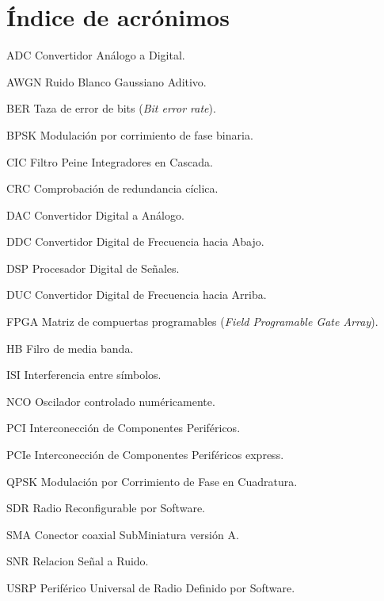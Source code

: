 \chapter*{\'Indice de acr\'onimos}
%

\begin{symbollist*}

\item[ADC]  Convertidor An\'alogo a Digital.
\item[AWGN] Ruido Blanco Gaussiano Aditivo.
\item[BER]  Taza de error de bits (\emph{Bit error rate}).
\item[BPSK] Modulaci\'on por corrimiento de fase binaria.
\item[CIC]  Filtro Peine Integradores en Cascada.
\item[CRC]  Comprobaci\'on de redundancia c\'iclica.
\item[DAC]  Convertidor Digital a An\'alogo.
\item[DDC]  Convertidor Digital de Frecuencia hacia Abajo.
\item[DSP]  Procesador Digital de Se\~nales.
\item[DUC]  Convertidor Digital de Frecuencia hacia Arriba.
\item[FPGA] Matriz de compuertas programables (\emph{Field Programable Gate Array}).
\item[HB]   Filro de media banda.
\item[ISI]  Interferencia entre s\'imbolos.
\item[NCO]  Oscilador controlado num\'ericamente.
\item[PCI]  Interconecci\'on de Componentes Perif\'ericos.
\item[PCIe] Interconecci\'on de Componentes Perif\'ericos express.
\item[QPSK] Modulaci\'on por Corrimiento de Fase en Cuadratura.
\item[SDR]  Radio Reconfigurable por Software.
\item[SMA]  Conector coaxial SubMiniatura versi\'on A.
\item[SNR]  Relacion Se\~nal a Ruido.
\item[USRP] Perif\'erico Universal de Radio Definido por Software.

\end{symbollist*}